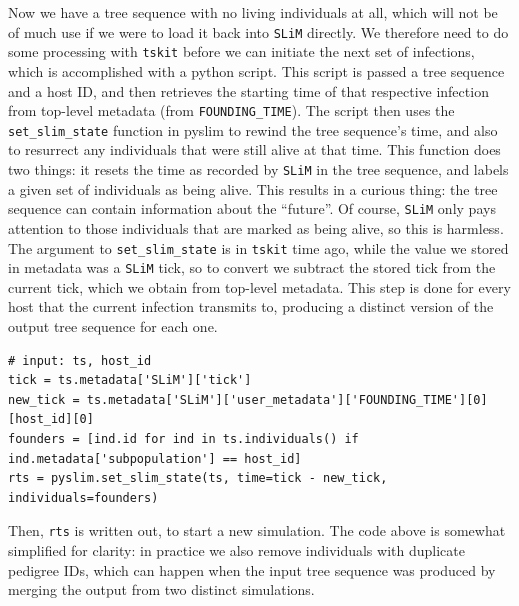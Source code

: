 \documentclass[12pt]{article}
\newcommand{\tskit}[0]{\texttt{tskit}\xspace}
\newcommand{\slim}[0]{\texttt{SLiM}\xspace}
\begin{document}
Now we have a tree sequence with no living individuals at all, which will not be of much use if we were to load it back into \slim directly. We therefore need to do some processing
with \tskit before we can initiate the next set of infections, which is accomplished with a python script.
This script is passed a tree sequence and a host ID,
and then retrieves the starting time of that respective infection from top-level metadata (from \verb|FOUNDING_TIME|).
The script then uses the \verb|set_slim_state| function in pyslim to rewind
the tree sequence's time, and also to resurrect any individuals that were still alive at that time.
This function does two things: it resets the time as recorded by \slim in the tree sequence,
and labels a given set of individuals as being alive.
This results in a curious thing: the tree sequence can contain information about the ``future''.
Of course, \slim only pays attention to those individuals that are marked as being alive,
so this is harmless.
The argument to \verb|set_slim_state| is in \tskit time ago,
while the value we stored in metadata was a \slim tick,
so to convert we subtract the stored tick from the current tick,
which we obtain from top-level metadata.
This step is done for every host that the current infection transmits to, producing
a distinct version of the output tree sequence for each one.
\begin{verbatim}
# input: ts, host_id
tick = ts.metadata['SLiM']['tick']
new_tick = ts.metadata['SLiM']['user_metadata']['FOUNDING_TIME'][0][host_id][0]
founders = [ind.id for ind in ts.individuals() if ind.metadata['subpopulation'] == host_id]
rts = pyslim.set_slim_state(ts, time=tick - new_tick, individuals=founders)
\end{verbatim}
Then, \verb|rts| is written out, to start a new simulation.
The code above is somewhat simplified for clarity:
in practice we also remove individuals with duplicate pedigree IDs,
which can happen when the input tree sequence was produced by merging
the output from two distinct simulations.
\end{document}
